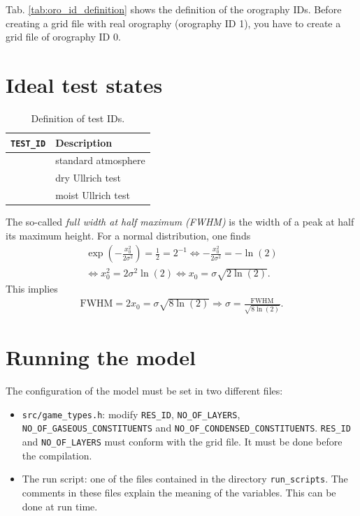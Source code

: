 \documentclass[10pt]{report}
\begin{document}
Tab. \ref{tab:oro_id_definition} shows the definition of the orography IDs. Before creating a grid file with real orography (orography ID 1), you have to create a grid file of orography ID 0.

\chapter{Ideal test states}
\label{chap:ideal_test_states}

\renewcommand{\arraystretch}{1.2}
\begin{table}
\centering
\begin{tabular}{|>{\centering}p{4.0 cm}|>{\centering}p{8 cm}|}
\hline \textbf{\texttt{TEST\_ID}} & \textbf{Description} \tabularnewline
\hline\hline 0 & standard atmosphere \tabularnewline
\hline 1 & dry Ullrich test \tabularnewline
\hline 2 & moist Ullrich test \tabularnewline
\hline
\end{tabular}
\caption{Definition of test IDs.}
\label{tab:test_id_definition}
\end{table}
\renewcommand{\arraystretch}{1}

The so-called \textit{full width at half maximum (FWHM)} is the width of a peak at half its maximum height. For a normal distribution, one finds
%
\begin{align}
\exp\left(-\frac{x_0^2}{2\sigma^2}\right) = \frac{1}{2} = 2^{-1}\Leftrightarrow -\frac{x_0^2}{2\sigma^2} = -\ln\left(2\right)\nonumber\\
\Leftrightarrow x_0^2 = 2\sigma^2\ln\left(2\right)\Leftrightarrow x_0 = \sigma\sqrt{2\ln\left(2\right)}.
\end{align}
%
This implies
%
\begin{align}
\text{FWHM} = 2x_0 = \sigma\sqrt{8\ln\left(2\right)} \Rightarrow \sigma = \frac{\text{FWHM}}{\sqrt{8\ln\left(2\right)}}.
\end{align}

\chapter{Running the model}
\label{chap:running_the_model}

The configuration of the model must be set in two different files:
%
\begin{itemize}
\item \texttt{src/game\_types.h}: modify \texttt{RES\_ID}, \texttt{NO\_OF\_LAYERS}, \texttt{NO\_OF\_GASEOUS\_CONSTITUENTS} and \texttt{NO\_OF\_CONDENSED\_CONSTITUENTS}. \texttt{RES\_ID} and \texttt{NO\_OF\_LAYERS} must conform with the grid file. It must be done before the compilation.
\item The run script: one of the files contained in the directory \texttt{run\_scripts}. The comments in these files explain the meaning of the variables. This can be done at run time.
\end{itemize}
\end{document}

